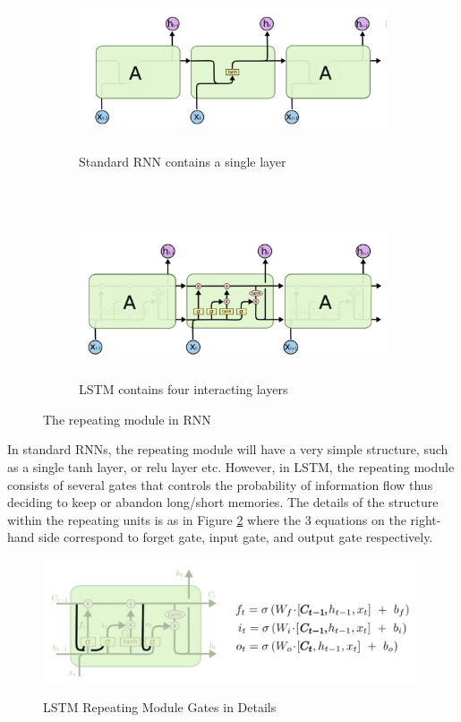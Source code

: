 \documentclass[11pt]{article}
\theoremstyle{plain}
\begin{document}
\begin{figure}[!ht]
	\centering
	\begin{subfigure}[b]{\textwidth}
		\centering
		\includegraphics[height=1.9in]{images/standardRNN.png}
		\caption{Standard RNN contains a single layer}
	\end{subfigure}%
	\\
	\begin{subfigure}[b]{\textwidth}
		\centering
		\includegraphics[height=1.9in]{images/lstmRNN.png}
		\caption{LSTM contains four interacting layers}
	\end{subfigure}
	\caption{The repeating module in RNN}\label{f:lstmrnn}\cite{olah-blog-lstm}
\end{figure}

In standard RNNs, the repeating module will have a very simple structure, 
such as a single tanh layer, or relu layer etc. However, in LSTM, the repeating 
module consists of several gates that controls the probability of information 
flow thus deciding to keep or abandon long/short memories. The details of 
the structure within the repeating units is as in Figure \ref{f:lstmgates} where 
the 3 equations on the right-hand side correspond to forget gate, input gate, 
and output gate respectively.  
\begin{figure}[!ht]
	\centering
	\includegraphics[width=\columnwidth]{images/LSTMgates.png}
	\caption{LSTM Repeating Module Gates in 
	Details}\label{f:lstmgates}\cite{olah-blog-lstm}
\end{figure}
\end{document}
